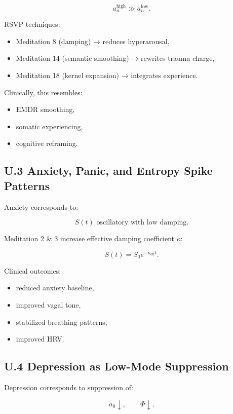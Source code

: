 \documentclass[12pt]{article}
\begin{document}
\[
a_n^{\text{high}} \gg a_n^{\text{low}}.
\]

RSVP techniques:

\begin{itemize}
\item Meditation 8 (damping) → reduces hyperarousal,
\item Meditation 14 (semantic smoothing) → rewrites trauma charge,
\item Meditation 18 (kernel expansion) → integrates experience.
\end{itemize}

Clinically, this resembles:

\begin{itemize}
\item EMDR smoothing,
\item somatic experiencing,
\item cognitive reframing.
\end{itemize}

\subsection*{U.3 Anxiety, Panic, and Entropy Spike Patterns}

Anxiety corresponds to:

\[
S(t) \text{ oscillatory with low damping}.
\]

Meditation 2 \& 3 increase effective damping coefficient $\kappa$:

\[
S(t) = S_0 e^{-\kappa_{\mathrm{eff}} t}.
\]

Clinical outcomes:

\begin{itemize}
\item reduced anxiety baseline,
\item improved vagal tone,
\item stabilized breathing patterns,
\item improved HRV.
\end{itemize}

\subsection*{U.4 Depression as Low-Mode Suppression}

Depression corresponds to suppression of:

\[
a_0 \downarrow, \qquad \Phi \downarrow.
\]
\end{document}
